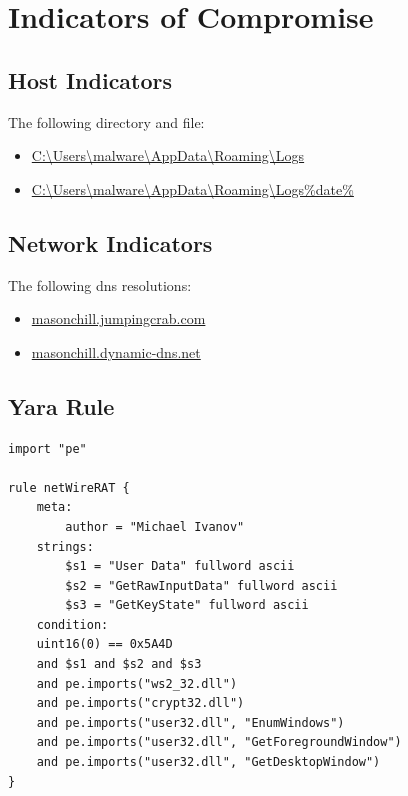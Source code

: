 \documentclass{article}
\begin{document}
    \section{Indicators of Compromise}
    \subsection{Host Indicators}
    The following directory and file:
    \begin{itemize}
        \item \url{C:\Users\malware\AppData\Roaming\Logs}
        \item \url{C:\Users\malware\AppData\Roaming\Logs\%date%}
    \end{itemize}
    \subsection{Network Indicators}
    The following dns resolutions:
    \begin{itemize}
        \item \url{masonchill.jumpingcrab.com}
        \item \url{masonchill.dynamic-dns.net}
    \end{itemize}
    \subsection{Yara Rule}
    \begin{lstlisting}
import "pe"

rule netWireRAT {
    meta:
        author = "Michael Ivanov"
    strings:
        $s1 = "User Data" fullword ascii
        $s2 = "GetRawInputData" fullword ascii
        $s3 = "GetKeyState" fullword ascii
    condition:
    uint16(0) == 0x5A4D
    and $s1 and $s2 and $s3
    and pe.imports("ws2_32.dll") 
    and pe.imports("crypt32.dll") 
    and pe.imports("user32.dll", "EnumWindows") 
    and pe.imports("user32.dll", "GetForegroundWindow") 
    and pe.imports("user32.dll", "GetDesktopWindow")  
}
    \end{lstlisting}
    \pagebreak
    \printbibliography
\end{document}
